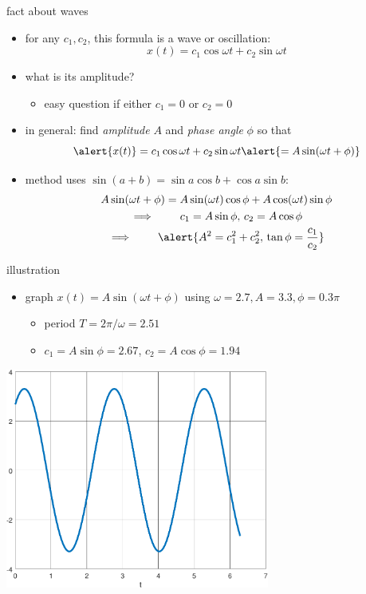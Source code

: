 \documentclass{beamer}
\begin{document}
\begin{frame}{fact about waves}

\begin{itemize}
\item for any $c_1,c_2$, this formula is a wave or oscillation:
    $$x(t) = c_1 \cos \omega t + c_2 \sin \omega t$$
\item what is its amplitude?
    \begin{itemize}
    \item easy question if either $c_1 =0$ or $c_2=0$
    \end{itemize}
\item in general: find  \emph{amplitude} $A$ and \emph{phase angle} $\phi$ so that
    $$\alert{x(t)} = c_1 \cos \omega t + c_2 \sin \omega t \alert{= A \sin(\omega t + \phi)}$$
\item method uses $\sin(a+b) = \sin a \cos b + \cos a \sin b$:
\begin{gather*}
A \sin(\omega t + \phi) = A \sin(\omega t) \cos\phi + A \cos(\omega t) \sin\phi \\
\implies \qquad c_1 = A \sin\phi, \, c_2 = A \cos \phi \\
\implies \qquad \alert{A^2 = c_1^2 + c_2^2, \, \tan \phi = \frac{c_1}{c_2}}
\end{gather*}
\end{itemize}
\end{frame}


\begin{frame}{illustration}

\begin{itemize}
\item graph $x(t) = A \sin(\omega t + \phi)$ using $\omega=2.7,A=3.3,\phi=0.3 \pi$
    \begin{itemize}
    \item period $T=2\pi/\omega = 2.51$
    \item $c_1 = A \sin \phi = 2.67$, $c_2 = A \cos \phi = 1.94$
    \end{itemize}
\end{itemize}

\hfill \includegraphics[width=0.65\textwidth]{figs/altwave}
\end{frame}
\end{document}
